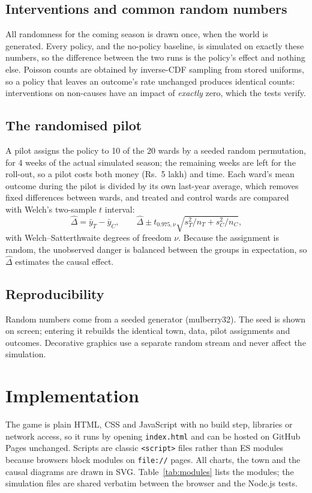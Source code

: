 \documentclass[11pt,a4paper]{article}
\begin{document}
\subsection{Interventions and common random numbers}
All randomness for the coming season is drawn once, when the world is generated. Every policy, and the no-policy baseline,
is simulated on exactly these numbers, so the difference between the two runs is the policy's effect and nothing else.
Poisson counts are obtained by inverse-CDF sampling from stored uniforms, so a policy that leaves an outcome's rate unchanged
produces identical counts: interventions on non-causes have an impact of \emph{exactly} zero, which the tests verify.

\subsection{The randomised pilot}
A pilot assigns the policy to 10 of the 20 wards by a seeded random permutation, for 4 weeks of the actual simulated season;
the remaining weeks are left for the roll-out, so a pilot costs both money (Rs.~5 lakh) and time. Each ward's mean outcome during
the pilot is divided by its own last-year average, which removes fixed differences between wards, and treated and control wards
are compared with Welch's two-sample $t$ interval:
\begin{equation}
\hat\Delta = \bar y_T - \bar y_C,\qquad \hat\Delta \pm t_{0.975,\nu}\sqrt{s_T^2/n_T + s_C^2/n_C},
\end{equation}
with Welch--Satterthwaite degrees of freedom $\nu$. Because the assignment is random, the unobserved danger is balanced
between the groups in expectation, so $\hat\Delta$ estimates the causal effect.

\subsection{Reproducibility}
Random numbers come from a seeded generator (mulberry32). The seed is shown on screen; entering it rebuilds the identical
town, data, pilot assignments and outcomes. Decorative graphics use a separate random stream and never affect the simulation.

\section{Implementation}
The game is plain HTML, CSS and JavaScript with no build step, libraries or network access, so it runs by opening
\texttt{index.html} and can be hosted on GitHub Pages unchanged. Scripts are classic \texttt{<script>} files rather than ES
modules because browsers block modules on \texttt{file://} pages. All charts, the town and the causal diagrams are drawn
in SVG. Table~\ref{tab:modules} lists the modules; the simulation files are shared verbatim between the browser and the
Node.js tests.
\end{document}
